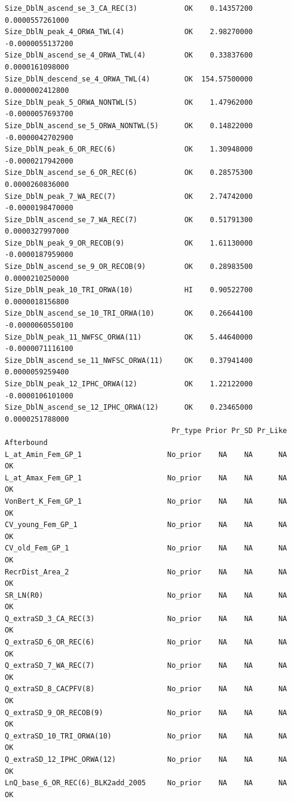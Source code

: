 \documentclass[
]{scrartcl}
\begin{document}
\begin{verbatim}
Size_DblN_ascend_se_3_CA_REC(3)           OK    0.14357200  0.0000557261000
Size_DblN_peak_4_ORWA_TWL(4)              OK    2.98270000 -0.0000055137200
Size_DblN_ascend_se_4_ORWA_TWL(4)         OK    0.33837600  0.0000161098000
Size_DblN_descend_se_4_ORWA_TWL(4)        OK  154.57500000  0.0000002412800
Size_DblN_peak_5_ORWA_NONTWL(5)           OK    1.47962000 -0.0000057693700
Size_DblN_ascend_se_5_ORWA_NONTWL(5)      OK    0.14822000 -0.0000042702900
Size_DblN_peak_6_OR_REC(6)                OK    1.30948000 -0.0000217942000
Size_DblN_ascend_se_6_OR_REC(6)           OK    0.28575300  0.0000260836000
Size_DblN_peak_7_WA_REC(7)                OK    2.74742000 -0.0000198470000
Size_DblN_ascend_se_7_WA_REC(7)           OK    0.51791300  0.0000327997000
Size_DblN_peak_9_OR_RECOB(9)              OK    1.61130000 -0.0000187959000
Size_DblN_ascend_se_9_OR_RECOB(9)         OK    0.28983500  0.0000210250000
Size_DblN_peak_10_TRI_ORWA(10)            HI    0.90522700  0.0000018156800
Size_DblN_ascend_se_10_TRI_ORWA(10)       OK    0.26644100 -0.0000060550100
Size_DblN_peak_11_NWFSC_ORWA(11)          OK    5.44640000 -0.0000071116100
Size_DblN_ascend_se_11_NWFSC_ORWA(11)     OK    0.37941400  0.0000059259400
Size_DblN_peak_12_IPHC_ORWA(12)           OK    1.22122000 -0.0000106101000
Size_DblN_ascend_se_12_IPHC_ORWA(12)      OK    0.23465000  0.0000251788000
                                       Pr_type Prior Pr_SD Pr_Like Afterbound
L_at_Amin_Fem_GP_1                    No_prior    NA    NA      NA         OK
L_at_Amax_Fem_GP_1                    No_prior    NA    NA      NA         OK
VonBert_K_Fem_GP_1                    No_prior    NA    NA      NA         OK
CV_young_Fem_GP_1                     No_prior    NA    NA      NA         OK
CV_old_Fem_GP_1                       No_prior    NA    NA      NA         OK
RecrDist_Area_2                       No_prior    NA    NA      NA         OK
SR_LN(R0)                             No_prior    NA    NA      NA         OK
Q_extraSD_3_CA_REC(3)                 No_prior    NA    NA      NA         OK
Q_extraSD_6_OR_REC(6)                 No_prior    NA    NA      NA         OK
Q_extraSD_7_WA_REC(7)                 No_prior    NA    NA      NA         OK
Q_extraSD_8_CACPFV(8)                 No_prior    NA    NA      NA         OK
Q_extraSD_9_OR_RECOB(9)               No_prior    NA    NA      NA         OK
Q_extraSD_10_TRI_ORWA(10)             No_prior    NA    NA      NA         OK
Q_extraSD_12_IPHC_ORWA(12)            No_prior    NA    NA      NA         OK
LnQ_base_6_OR_REC(6)_BLK2add_2005     No_prior    NA    NA      NA         OK

\end{verbatim}
\end{document}

